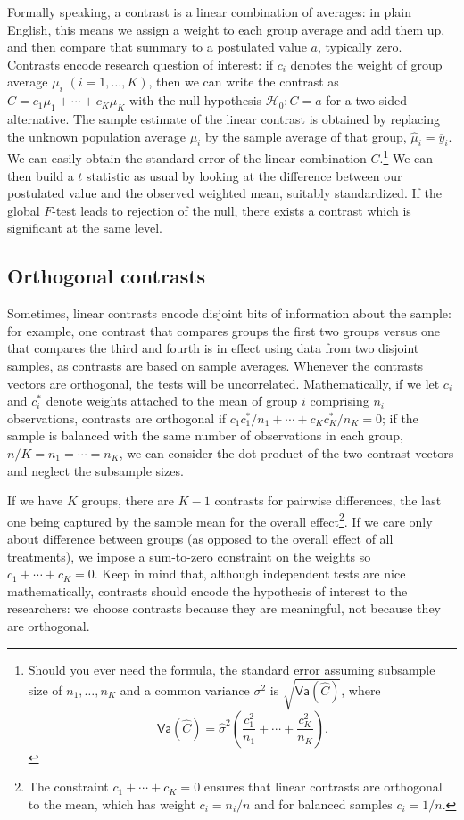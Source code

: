 \documentclass[
  11pt,
  letterpaper,
]{scrbook}
\theoremstyle{definition}
\theoremstyle{definition}
\theoremstyle{remark}
\begin{document}
Formally speaking, a contrast is a linear combination of averages: in
plain English, this means we assign a weight to each group average and
add them up, and then compare that summary to a postulated value \(a\),
typically zero. Contrasts encode research question of interest: if
\(c_i\) denotes the weight of group average \(\mu_i\)
\((i=1, \ldots, K)\), then we can write the contrast as
\(C = c_1 \mu_1 + \cdots + c_K \mu_K\) with the null hypothesis
\(\mathscr{H}_0: C=a\) for a two-sided alternative. The sample estimate
of the linear contrast is obtained by replacing the unknown population
average \(\mu_i\) by the sample average of that group,
\(\widehat{\mu}_i = \overline{y}_{i}\). We can easily obtain the
standard error of the linear combination \(C.\)\footnote{Should you ever
  need the formula, the standard error assuming subsample size of
  \(n_1, \ldots, n_K\) and a common variance \(\sigma^2\) is
  \(\sqrt{\mathsf{Va}(\widehat{C})}\), where
  \[\mathsf{Va}(\widehat{C}) = \widehat{\sigma}^2\left(\frac{c_1^2}{n_1} + \cdots + \frac{c_K^2}{n_K}\right).\]}
We can then build a \(t\) statistic as usual by looking at the
difference between our postulated value and the observed weighted mean,
suitably standardized. If the global \(F\)-test leads to rejection of
the null, there exists a contrast which is significant at the same
level.

\subsection{Orthogonal contrasts}\label{orthogonal-contrasts}

Sometimes, linear contrasts encode disjoint bits of information about
the sample: for example, one contrast that compares groups the first two
groups versus one that compares the third and fourth is in effect using
data from two disjoint samples, as contrasts are based on sample
averages. Whenever the contrasts vectors are orthogonal, the tests will
be uncorrelated. Mathematically, if we let \(c_{i}\) and \(c^{*}_{i}\)
denote weights attached to the mean of group \(i\) comprising \(n_i\)
observations, contrasts are orthogonal if
\(c_{1}c^{*}_{1}/n_1 + \cdots + c_{K}c^{*}_K/n_K = 0\); if the sample is
balanced with the same number of observations in each group,
\(n/K = n_1 =\cdots = n_K\), we can consider the dot product of the two
contrast vectors and neglect the subsample sizes.

If we have \(K\) groups, there are \(K-1\) contrasts for pairwise
differences, the last one being captured by the sample mean for the
overall effect\footnote{The constraint \(c_1 + \cdots + c_K=0\) ensures
  that linear contrasts are orthogonal to the mean, which has weight
  \(c_i=n_i/n\) and for balanced samples \(c_i =1/n\).}. If we care only
about difference between groups (as opposed to the overall effect of all
treatments), we impose a sum-to-zero constraint on the weights so
\(c_1 + \cdots + c_K=0\). Keep in mind that, although independent tests
are nice mathematically, contrasts should encode the hypothesis of
interest to the researchers: we choose contrasts because they are
meaningful, not because they are orthogonal.
\end{document}
